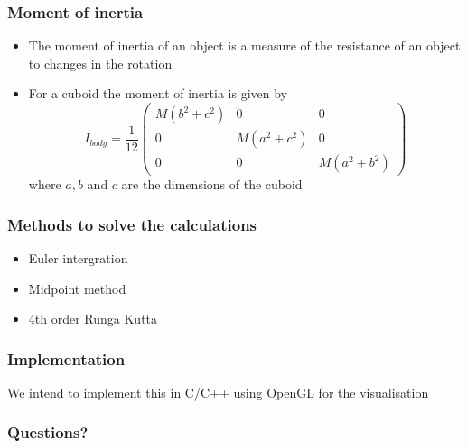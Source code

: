 \documentclass{beamer}
\begin{document}
\begin{frame}
 \frametitle{Moment of inertia}
 \begin{itemize}
  \item 
  The moment of inertia of an object is a measure of the resistance of an object to changes in the rotation

  \item
  For a cuboid the moment of inertia is given by
  \begin{displaymath}
    I_{body} = \frac{1}{12} \begin{pmatrix}
			    M(b^2 + c^2) & 0 & 0 \\
			    0 & M(a^2 + c^2) & 0 \\
			    0 & 0 & M(a^2 + b^2)
			    \end{pmatrix}
  \end{displaymath}
  where $a, b$ and $c$ are the dimensions of the cuboid
 \end{itemize}
\end{frame}

\begin{frame}
 \frametitle{Methods to solve the calculations}
 \begin{itemize}
  \item Euler intergration
  \item Midpoint method
  \item 4th order Runga Kutta
 \end{itemize}
\end{frame}

\begin{frame}
 \frametitle{Implementation}
 We intend to implement this in C/C++ using OpenGL for the visualisation
\end{frame}

 \begin{frame}
  \frametitle{Questions?}
 \end{frame}
\end{document}
